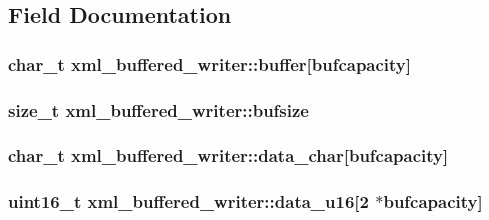 \subsection{Field Documentation}
\hypertarget{classxml__buffered__writer_a84c87765fbdf444d981ffb0f67899dd4}{
\subsubsection[{buffer}]{\setlength{\rightskip}{0pt plus 5cm}char\-\_\-t xml\-\_\-buffered\-\_\-writer\-::buffer\mbox{[}{\bf bufcapacity}\mbox{]}}}\label{classxml__buffered__writer_a84c87765fbdf444d981ffb0f67899dd4}
\hypertarget{classxml__buffered__writer_a6bad6a93035d796939d84bee30e74ce7}{
\subsubsection[{bufsize}]{\setlength{\rightskip}{0pt plus 5cm}size\-\_\-t xml\-\_\-buffered\-\_\-writer\-::bufsize}}\label{classxml__buffered__writer_a6bad6a93035d796939d84bee30e74ce7}
\hypertarget{classxml__buffered__writer_a6f21e839a1c66901995c8aae5cc9ad7b}{
\subsubsection[{data\-\_\-char}]{\setlength{\rightskip}{0pt plus 5cm}char\-\_\-t xml\-\_\-buffered\-\_\-writer\-::data\-\_\-char\mbox{[}{\bf bufcapacity}\mbox{]}}}\label{classxml__buffered__writer_a6f21e839a1c66901995c8aae5cc9ad7b}
\hypertarget{classxml__buffered__writer_aa969d3724efe221a68927947e3a5196d}{
\subsubsection[{data\-\_\-u16}]{\setlength{\rightskip}{0pt plus 5cm}uint16\-\_\-t xml\-\_\-buffered\-\_\-writer\-::data\-\_\-u16\mbox{[}2 $\ast${\bf bufcapacity}\mbox{]}}}\label{classxml__buffered__writer_aa969d3724efe221a68927947e3a5196d}
